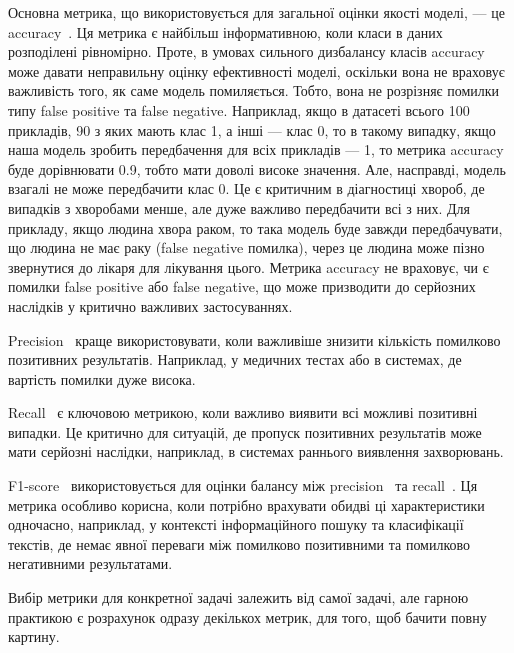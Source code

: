 Основна метрика, що використовується для загальної оцінки якості моделі, — це accuracy~\cite{ct6}. Ця метрика є найбільш інформативною, коли класи в даних розподілені рівномірно. Проте, в умовах сильного дизбалансу класів accuracy~\cite{ct6} може давати неправильну оцінку ефективності моделі, оскільки вона не враховує важливість того, як саме модель помиляється. Тобто, вона не розрізняє помилки типу false positive та false negative. Наприклад, якщо в датасеті всього 100 прикладів, 90 з яких мають клас 1, а інші — клас 0, то в такому випадку, якщо наша модель зробить передбачення для всіх прикладів — 1, то метрика accuracy буде дорівнювати 0.9, тобто мати доволі високе значення. Але, насправді, модель взагалі не може передбачити клас 0. Це є критичним в діагностиці хвороб, де випадків з хворобами менше, але дуже важливо передбачити всі з них. Для прикладу, якщо людина хвора раком, то така модель буде завжди передбачувати, що людина не має раку (false negative помилка), через це людина може пізно звернутися до лікаря для лікування цього. Метрика accuracy не враховує, чи є помилки false positive або false negative, що може призводити до серйозних наслідків у критично важливих застосуваннях.

Precision~\cite{ct6} краще використовувати, коли важливіше знизити кількість помилково позитивних результатів. Наприклад, у медичних тестах або в системах, де вартість помилки дуже висока.

Recall~\cite{ct7} є ключовою метрикою, коли важливо виявити всі можливі позитивні випадки. Це критично для ситуацій, де пропуск позитивних результатів може мати серйозні наслідки, наприклад, в системах раннього виявлення захворювань.

F1-score~\cite{ct8} використовується для оцінки балансу між precision~\cite{ct6} та recall~\cite{ct7}. Ця метрика особливо корисна, коли потрібно врахувати обидві ці характеристики одночасно, наприклад, у контексті інформаційного пошуку та класифікації текстів, де немає явної переваги між помилково позитивними та помилково негативними результатами.

Вибір метрики для конкретної задачі залежить від самої задачі, але гарною практикою є розрахунок одразу декількох метрик, для того, щоб бачити повну картину.

